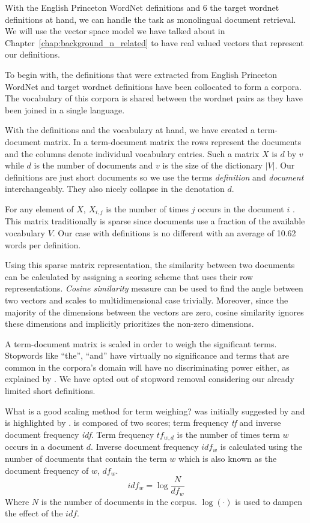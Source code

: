 With the English Princeton WordNet definitions and 6 the target wordnet definitions at hand, we can handle the task as monolingual document retrieval.
We will use the vector space model we have talked about in Chapter~\ref{chap:background_n_related} to have real valued vectors that represent our definitions.

To begin with, the definitions that were extracted from English Princeton WordNet and target wordnet definitions have been collocated to form a corpora.
The vocabulary of this corpora is shared between the wordnet pairs as they have been joined in a single language.

With the definitions and the vocabulary at hand, we have created a term-document matrix.
In a term-document matrix the rows represent the documents and the columns denote individual vocabulary entries.
Such a matrix $X$ is $d$ by $v$ while $d$ is the number of documents and $v$ is the size of the dictionary $|V|$.
Our definitions are just short documents so we use the terms \emph{definition} and \emph{document} interchangeably.
They also nicely collapse in the denotation $d$.

For any element of $X$, $X_{i,j}$ is the number of times $j$ occurs in the document $i$ .
This matrix traditionally is sparse since documents use a fraction of the available vocabulary $V$.
Our case with definitions is no different with an average of 10.62 words per definition.

Using this sparse matrix representation, the similarity between two documents can be calculated by assigning a scoring scheme that uses their row representations.
\emph{Cosine similarity} measure can be used to find the angle between two vectors and scales to multidimensional case trivially.
Moreover, since the majority of the dimensions between the vectors are zero, cosine similarity ignores these dimensions and implicitly prioritizes the non-zero dimensions.

A term-document matrix is scaled in order to weigh the significant terms.
Stopwords like \enquote{the}, \enquote{and} have virtually no significance and terms that are common in the corpora's domain will have no discriminating power either, as explained by \textcite{manning_introduction_2009}.
We have opted out of stopword removal considering our already limited short definitions.

What is a good scaling method for term weighing?
\tfidf{} was initially suggested by \textcite{jones_statistical_1972} and is highlighted by \textcite{manning_introduction_2009}.
\tfidf{} is composed of two scores; term frequency \emph{tf} and inverse document frequency \emph{idf}.
Term frequency $tf_{w,d}$ is the number of times term $w$ occurs in a document $d$.
Inverse document frequency $idf_{w}$ is calculated using the number of documents that contain the term $w$ which is also known as the document frequency of $w$, $df_w$.
\begin{equation}
    idf_w = \log{\frac{N}{df_w}}
\end{equation}
Where $N$ is the number of documents in the corpus. $\log(\cdot)$ is used to dampen the effect of the $idf$.

